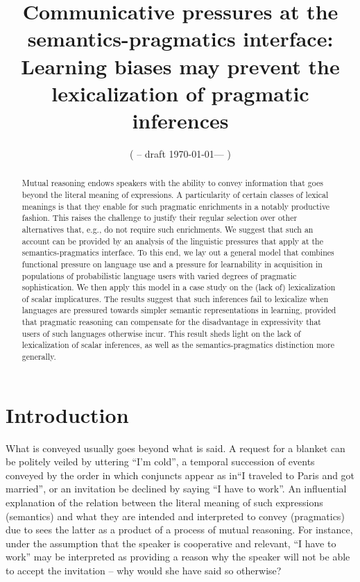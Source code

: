 \documentclass[a4paper]{article}
\title{Communicative pressures at the semantics-pragmatics interface:\\ Learning biases may prevent the lexicalization of pragmatic inferences}
\author{%
    ( -- draft \today --- )
}
\date{}
\begin{document}
\maketitle

\begin{abstract} 
Mutual reasoning endows speakers with the ability to convey information that goes beyond the literal meaning of expressions. A particularity of certain classes of lexical meanings is that they enable for such pragmatic enrichments in a notably productive fashion. This raises the challenge to justify their regular selection over other alternatives that, e.g., do not require such enrichments. We suggest that such an account can be provided by an analysis of the linguistic pressures that apply at the semantics-pragmatics interface. To this end, we lay out a general model that combines functional pressure on language use and a pressure for learnability in acquisition in populations of probabilistic language users with varied degrees of pragmatic sophistication. We then apply this model in a case study on the (lack of) lexicalization of scalar implicatures. The results suggest that such inferences fail to lexicalize when languages are pressured towards simpler semantic representations in learning, provided that pragmatic reasoning can compensate for the disadvantage in expressivity that users of such languages otherwise incur. This result sheds light on the lack of lexicalization of scalar inferences, as well as the semantics-pragmatics distinction more generally.
\end{abstract}

\section{Introduction}\label{sec:introduction}
What is conveyed usually goes beyond what is said. A request for a blanket can be politely veiled by uttering ``I'm cold'', a temporal succession of events conveyed by the order in which conjuncts appear as in``I traveled to Paris and got married'', or an invitation be declined by saying ``I have to work''. An influential explanation of the relation between the literal meaning of such expressions (semantics) and what they are intended and interpreted to convey (pragmatics) due to \citet{grice:1975} sees the latter as a product of a process of mutual reasoning. For instance, under the assumption that the speaker is cooperative and relevant, ``I have to work'' may be interpreted as providing a reason why the speaker will not be able to accept the invitation -- why would she have said so otherwise?
\end{document}
